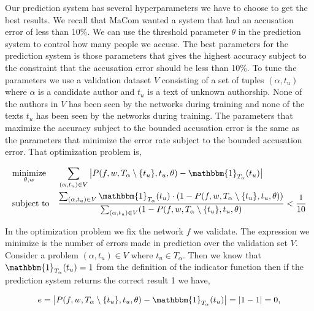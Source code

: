 Our prediction system has several hyperparameters we have to choose to get
the best results. We recall that MaCom wanted a system that had an accusation
error of less than 10\%. We can use the threshold parameter $\theta$ in the
prediction system to control how many people we accuse. The best parameters
for the prediction system is those parameters that gives the highest accuracy
subject to the constraint that the accusation error should be less than 10\%.
To tune the parameters we use a validation dataset $V$ consisting of a set of
tuples $(\alpha, t_u)$ where $\alpha$ is a candidate author and $t_u$ is a text
of unknown authorship. None of the authors in $V$ has been seen by the networks
during training and none of the texts $t_u$ has been seen by the networks during
training. The parameters that maximize the accuracy subject to the bounded
accusation error is the same as the parameters that minimize the error rate
subject to the bounded accusation error. That optimization problem is,

\begin{equation}
    \label{eq:prediction_system_minimization}
    \begin{aligned}
        & \underset{\theta, w}{\text{minimize}}
        & & \sum_{(\alpha, t_u) \in V} \left|
            P(f, w, T_\alpha \setminus \{t_u\}, t_u, \theta) -
            \mathbbm{1}_{T_\alpha}(t_u)
        \right| \\
        & \text{subject to}
        & & \frac{\sum_{(\alpha, t_u) \in V} \mathbbm{1}_{T_\alpha}(t_u) \cdot
            \left(1 - P(f, w, T_\alpha \setminus \{t_u\}, t_u, \theta)\right)}
{\sum_{(\alpha, t_u) \in V} (1 - P(f, w, T_\alpha \setminus \{t_u\}, t_u, \theta)} <
            \frac{1}{10}
    \end{aligned}
\end{equation}

In the optimization problem we fix the network $f$ we validate. The expression
we minimize is the number of errors made in prediction over the validation set
$V$. Consider a problem $(\alpha, t_u) \in V$ where $t_u \in T_\alpha$. Then we
know that $\mathbbm{1}_{T_\alpha}(t_u) = 1$ from the definition of the indicator
function then if the prediction system returns the correct result 1 we have,

\begin{equation}
    e = \left|
        P(f, w, T_\alpha \setminus \{t_u\}, t_u, \theta) -
        \mathbbm{1}_{T_\alpha}(t_u)
    \right| = |1 - 1| = 0,
\end{equation}

